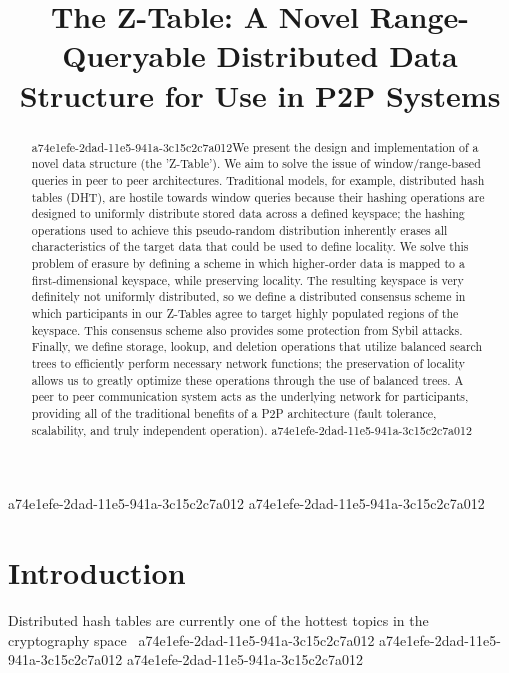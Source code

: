 \documentclass[12pt]{article}
\title{The Z-Table: A Novel Range-Queryable Distributed Data Structure for Use in P2P Systems}
\begin{document}
\maketitle
a74e1efe-2dad-11e5-941a-3c15c2c7a012
a74e1efe-2dad-11e5-941a-3c15c2c7a012\begin{abstract}
a74e1efe-2dad-11e5-941a-3c15c2c7a012We present the design and implementation of a novel data structure (the 'Z-Table'). We aim to solve the issue of window/range-based queries in peer to peer architectures. Traditional models, for example,  distributed hash tables (DHT), are hostile towards window queries because their hashing operations are designed to uniformly distribute stored data across a defined keyspace; the hashing operations used to achieve this pseudo-random distribution inherently erases all characteristics of the target data that could be used to define locality. We solve this problem of erasure by defining a scheme in which higher-order data is mapped to a first-dimensional keyspace, while preserving locality. The resulting keyspace is very definitely not uniformly distributed, so we define a distributed consensus scheme in which participants in our Z-Tables agree to target highly populated regions of the keyspace. This consensus scheme also provides some protection from Sybil attacks. Finally, we define storage, lookup, and deletion operations that utilize balanced search trees to efficiently perform necessary network functions; the preservation of locality allows us to greatly optimize these operations through the use of balanced trees. A peer to peer communication system acts as the underlying network for participants, providing all of the traditional benefits of a P2P architecture (fault tolerance, scalability, and truly independent operation).
a74e1efe-2dad-11e5-941a-3c15c2c7a012\end{abstract}


\newpage
\section{Introduction}
Distributed hash tables are currently one of the hottest topics in the cryptography space~\cite{Stoica:2001dj,Rowstron:2001ea,Ratnasamy:2001wn}
a74e1efe-2dad-11e5-941a-3c15c2c7a012
a74e1efe-2dad-11e5-941a-3c15c2c7a012\printbibliography
a74e1efe-2dad-11e5-941a-3c15c2c7a012
\end{document}
